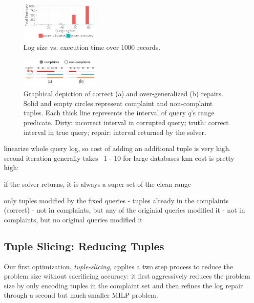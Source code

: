 \begin{figure}[t]
    \centering
    \includegraphics[width=0.35\textwidth]{figures/qsize_time_badscale}
    \vspace*{-0.1in}
    \caption{Log size vs. execution time over 1000 records. }
    \label{fig:querysize_vs_time}
\end{figure}

\begin{figure}[t]
    \centering
    \includegraphics[width=0.35\textwidth]{figures/2nditerationgroups}
    \vspace*{-2mm}
    \caption{
      Graphical depiction of correct (a) and over-generalized (b) repairs.
      Solid and empty circles represent complaint and non-complaint tuples.
      Each thick line represents the interval of query $q$'s range predicate.
      Dirty: incorrect interval in corrupted query;
      truth: correct interval in true query;
      repair: interval returned by the solver.}
    \label{fig:groups}
\end{figure}



linearize whole query log, so cost of adding an additional tuple is very high.
second iteration generally takes ~1 - 10
for large databases knn cost is pretty high: ~

if the solver returns, it is always a super set of the clean range

only tuples modified by the fixed queries
- tuples already in the complaints (correct)
- not in complaints, but any of the originial queries modified it
- not in complaints, but no original queries modified it
\fi



\subsection{Tuple Slicing: Reducing Tuples}
\label{sec:opt:tbsize}


Our first optimization, \emph{tuple-slicing}, applies a two step process to reduce the 
problem size without sacrificing accuracy: it
first aggressively reduces
the problem size by only encoding tuples in the complaint set and then refines the log repair 
through a second but much smaller MILP problem. 

